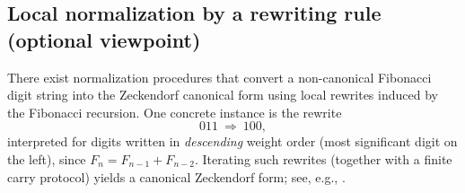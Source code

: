 \subsection{Local normalization by a rewriting rule (optional viewpoint)}
There exist normalization procedures that convert a non-canonical Fibonacci digit string into the Zeckendorf canonical form using local rewrites induced by the Fibonacci recursion.
One concrete instance is the rewrite
\[
011 \ \Rightarrow\ 100,
\]
interpreted for digits written in \emph{descending} weight order (most significant digit on the left), since $F_{n}=F_{n-1}+F_{n-2}$.
Iterating such rewrites (together with a finite carry protocol) yields a canonical Zeckendorf form; see, e.g., \cite{AlloucheShallit2003}.


